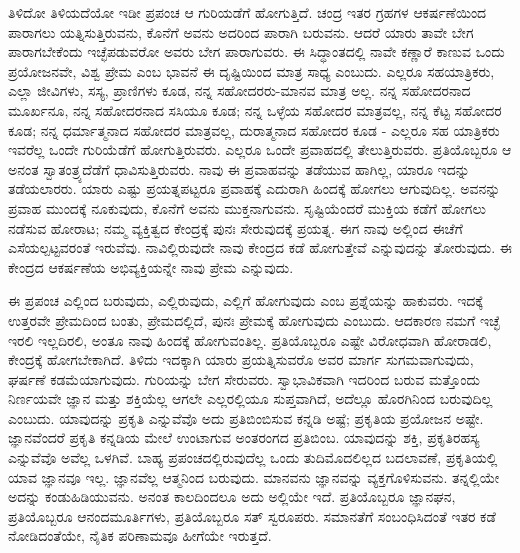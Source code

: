 ತಿಳಿದೋ ತಿಳಿಯದೆಯೋ ಇಡೀ ಪ್ರಪಂಚ ಆ ಗುರಿಯಡೆಗೆ ಹೋಗುತ್ತಿದೆ. ಚಂದ್ರ ಇತರ ಗ್ರಹಗಳ ಆಕರ್ಷಣೆಯಿಂದ ಪಾರಾಗಲು ಯತ್ನಿಸುತ್ತಿರುವನು, ಕೊನೆಗೆ ಅವನು ಅದರಿಂದ ಪಾರಾಗಿ ಬರುವನು. ಆದರೆ ಯಾರು ತಾವೇ ಬೇಗ ಪಾರಾಗಬೇಕೆಂದು ಇಚ್ಛೆಪಡುವರೋ ಅವರು ಬೇಗ ಪಾರಾಗುವರು. ಈ ಸಿದ್ಧಾಂತದಲ್ಲಿ ನಾವೇ ಕಣ್ಣಾರೆ ಕಾಣುವ ಒಂದು ಪ್ರಯೋಜನವೇ, ವಿಶ್ವ ಪ್ರೇಮ ಎಂಬ ಭಾವನೆ ಈ ದೃಷ್ಟಿಯಿಂದ ಮಾತ್ರ ಸಾಧ್ಯ ಎಂಬುದು. ಎಲ್ಲರೂ ಸಹಯಾತ್ರಿಕರು, ಎಲ್ಲಾ ಜೀವಿಗಳು, ಸಸ್ಯ, ಪ್ರಾಣಿಗಳು ಕೂಡ, ನನ್ನ ಸಹೋದರರು-ಮಾನವ ಮಾತ್ರ ಅಲ್ಲ. ನನ್ನ ಸಹೋದರನಾದ ಮೂರ್ಖನೂ, ನನ್ನ ಸಹೋದರನಾದ ಸಸಿಯೂ ಕೂಡ; ನನ್ನ ಒಳ್ಳೆಯ ಸಹೋದರ ಮಾತ್ರವಲ್ಲ, ನನ್ನ ಕೆಟ್ಟ ಸಹೋದರ ಕೂಡ; ನನ್ನ ಧರ್ಮಾತ್ಮನಾದ ಸಹೋದರ ಮಾತ್ರವಲ್ಲ, ದುರಾತ್ಮನಾದ ಸಹೋದರ ಕೂಡ - ಎಲ್ಲರೂ ಸಹ ಯಾತ್ರಿಕರು ಇವರೆಲ್ಲ ಒಂದೇ ಗುರಿಯೆಡೆಗೆ ಹೋಗುತ್ತಿರುವರು. ಎಲ್ಲರೂ ಒಂದೇ ಪ್ರವಾಹದಲ್ಲಿ ತೇಲುತ್ತಿರುವರು. ಪ್ರತಿಯೊಬ್ಬರೂ ಆ ಅನಂತ ಸ್ವಾತಂತ್ರ್ಯದೆಡೆಗೆ ಧಾವಿಸುತ್ತಿರುವರು. ನಾವು ಈ ಪ್ರವಾಹವನ್ನು ತಡೆಯುವ ಹಾಗಿಲ್ಲ, ಯಾರೂ ಇದನ್ನು ತಡೆಯಲಾರರು. ಯಾರು ಎಷ್ಟು ಪ್ರಯತ್ನಪಟ್ಟರೂ ಪ್ರವಾಹಕ್ಕೆ ಎದುರಾಗಿ ಹಿಂದಕ್ಕೆ ಹೋಗಲು ಆಗುವುದಿಲ್ಲ. ಅವನನ್ನು ಪ್ರವಾಹ ಮುಂದಕ್ಕೆ ನೂಕುವುದು, ಕೊನೆಗೆ ಅವನು ಮುಕ್ತನಾಗುವನು. ಸೃಷ್ಟಿಯೆಂದರೆ ಮುಕ್ತಿಯ ಕಡೆಗೆ ಹೋಗಲು ನಡೆಸುವ ಹೋರಾಟ; ನಮ್ಮ ವ್ಯಕ್ತಿತ್ವದ ಕೇಂದ್ರಕ್ಕೆ ಪುನಃ ಸೇರುವುದಕ್ಕೆ ಪ್ರಯತ್ನ. ಈಗ ನಾವು ಅಲ್ಲಿಂದ ಈಚೆಗೆ ಎಸೆಯಲ್ಪಟ್ಟವರಂತೆ ಇರುವೆವು. ನಾವಿಲ್ಲಿರುವುದೇ ನಾವು ಕೇಂದ್ರದ ಕಡೆ ಹೋಗುತ್ತೇವೆ ಎನ್ನುವುದನ್ನು ತೋರುವುದು. ಈ ಕೇಂದ್ರದ ಆಕರ್ಷಣೆಯ ಅಭಿವ್ಯಕ್ತಿಯನ್ನೇ ನಾವು ಪ್ರೇಮ ಎನ್ನುವುದು.

ಈ ಪ್ರಪಂಚ ಎಲ್ಲಿಂದ ಬರುವುದು, ಎಲ್ಲಿರುವುದು, ಎಲ್ಲಿಗೆ ಹೋಗುವುದು ಎಂಬ ಪ್ರಶ್ನೆಯನ್ನು ಹಾಕುವರು. ಇದಕ್ಕೆ ಉತ್ತರವೇ ಪ್ರೇಮದಿಂದ ಬಂತು, ಪ್ರೇಮದಲ್ಲಿದೆ, ಪುನಃ ಪ್ರೇಮಕ್ಕೆ ಹೋಗುವುದು ಎಂಬುದು. ಆದಕಾರಣ ನಮಗೆ ಇಚ್ಛೆ ಇರಲಿ ಇಲ್ಲದಿರಲಿ, ಅಂತೂ ನಾವು ಹಿಂದಕ್ಕೆ ಹೋಗುವಂತಿಲ್ಲ. ಪ್ರತಿಯೊಬ್ಬರೂ ಎಷ್ಟೇ ವಿರೋಧವಾಗಿ ಹೋರಾಡಲಿ, ಕೇಂದ್ರಕ್ಕೆ ಹೋಗಬೇಕಾಗಿದೆ. ತಿಳಿದು ಇದಕ್ಕಾಗಿ ಯಾರು ಪ್ರಯತ್ನಿಸುವರೊ ಅವರ ಮಾರ್ಗ ಸುಗಮವಾಗುವುದು, ಘರ್ಷಣೆ ಕಡಮೆಯಾಗುವುದು. ಗುರಿಯನ್ನು ಬೇಗ ಸೇರುವರು. ಸ್ವಾಭಾವಿಕವಾಗಿ ಇದರಿಂದ ಬರುವ ಮತ್ತೊಂದು ನಿರ್ಣಯವೇ ಜ್ಞಾನ ಮತ್ತು ಶಕ್ತಿಯೆಲ್ಲ ಆಗಲೇ ಎಲ್ಲರಲ್ಲಿಯೂ ಸುಪ್ತವಾಗಿದೆ, ಅದೆಲ್ಲೂ ಹೊರಗಿನಿಂದ ಬರುವುದಿಲ್ಲ ಎಂಬುದು. ಯಾವುದನ್ನು ಪ್ರಕೃತಿ ಎನ್ನುವೆವೊ ಅದು ಪ್ರತಿಬಿಂಬಿಸುವ ಕನ್ನಡಿ ಅಷ್ಟೆ; ಪ್ರಕೃತಿಯ ಪ್ರಯೋಜನ ಅಷ್ಟೇ. ಜ್ಞಾನವೆಂದರೆ ಪ್ರಕೃತಿ ಕನ್ನಡಿಯ ಮೇಲೆ ಉಂಟಾಗುವ ಅಂತರಂಗದ ಪ್ರತಿಬಿಂಬ. ಯಾವುದನ್ನು ಶಕ್ತಿ, ಪ್ರಕೃತಿರಹಸ್ಯ ಎನ್ನುವೆವೊ ಅವೆಲ್ಲ ಒಳಗಿವೆ. ಬಾಹ್ಯ ಪ್ರಪಂಚದಲ್ಲಿರುವುದೆಲ್ಲ ಒಂದು ತುದಿಮೊದಲಿಲ್ಲದ ಬದಲಾವಣೆ, ಪ್ರಕೃತಿಯಲ್ಲಿ ಯಾವ ಜ್ಞಾನವೂ ಇಲ್ಲ. ಜ್ಞಾನವೆಲ್ಲ ಆತ್ಮನಿಂದ ಬರುವುದು. ಮಾನವನು ಜ್ಞಾನವನ್ನು ವ್ಯಕ್ತಗೊಳಿಸುವನು. ತನ್ನಲ್ಲಿಯೇ ಅದನ್ನು ಕಂಡುಹಿಡಿಯುವನು. ಅನಂತ ಕಾಲದಿಂದಲೂ ಅದು ಅಲ್ಲಿಯೇ ಇದೆ. ಪ್ರತಿಯೊಬ್ಬರೂ ಜ್ಞಾನಘನ, ಪ್ರತಿಯೊಬ್ಬರೂ ಆನಂದಮೂರ್ತಿಗಳು, ಪ್ರತಿಯೊಬ್ಬರೂ ಸತ್ ಸ್ವರೂಪರು. ಸಮಾನತೆಗೆ ಸಂಬಂಧಿಸಿದಂತೆ ಇತರ ಕಡೆ ನೋಡಿದಂತೆಯೇ, ನೈತಿಕ ಪರಿಣಾಮವೂ ಹೀಗೆಯೇ ಇರುತ್ತದೆ.

